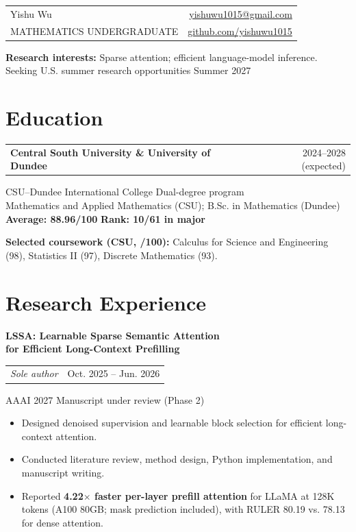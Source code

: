 \documentclass[11pt,letterpaper]{article}
\makeatletter
\newcommand{\datedline}[2]{\begin{tabularx}{\linewidth}{@{}X@{\hspace{12pt}}r@{}}#1 & {\small\color{muted}#2}\end{tabularx}}
\makeatother
\begin{document}
\fontsize{11}{14.5}\selectfont
\color{ink}
\begin{tabularx}{\linewidth}{@{}Xr@{}}
{\fontsize{30}{32}\selectfont Yishu Wu} & \href{mailto:yishuwu1015@gmail.com}{yishuwu1015@gmail.com}\\
{\small\color{muted}MATHEMATICS UNDERGRADUATE} & \href{https://github.com/yishuwu1015}{github.com/yishuwu1015}
\end{tabularx}
\par\vspace{5pt}
\textbf{Research interests:} Sparse attention; efficient language-model inference.\\
{\color{muted}Seeking U.S. summer research opportunities \enspace\textbar\enspace Summer 2027}

\section{Education}
\datedline{\textbf{Central South University \& University of Dundee}}{2024--2028 (expected)}
CSU--Dundee International College \enspace\textbar\enspace Dual-degree program\\
Mathematics and Applied Mathematics (CSU); B.Sc. in Mathematics (Dundee)\\
\textbf{Average: 88.96/100} \quad\textbar\quad \textbf{Rank: 10/61 in major}

{\small\textbf{Selected coursework (CSU, /100):} Calculus for Science and Engineering (98), Statistics II (97), Discrete Mathematics (93).}

\section{Research Experience}
\textbf{LSSA: Learnable Sparse Semantic Attention\\for Efficient Long-Context Prefilling}\\
\datedline{\textit{Sole author}}{Oct. 2025 -- Jun. 2026}
{\small\color{muted}AAAI 2027 \enspace\textbar\enspace Manuscript under review (Phase 2)}
\begin{itemize}
\item Designed denoised supervision and learnable block selection for efficient long-context attention.
\item Conducted literature review, method design, Python implementation, and manuscript writing.
\item Reported \textbf{4.22$\times$ faster per-layer prefill attention} for LLaMA at 128K tokens (A100 80GB; mask prediction included), with RULER 80.19 vs. 78.13 for dense attention.
\end{itemize}
\end{document}
